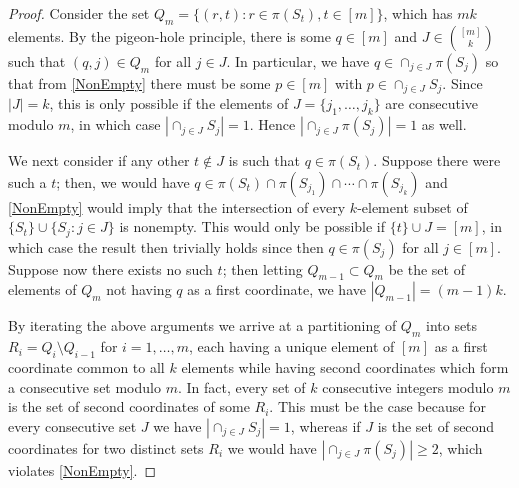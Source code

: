 \documentclass[journal, onecolumn]{IEEEtran}
\begin{document}
\begin{proof} Consider the set $Q_m = \{ (r,t) : r \in \pi(S_t), t \in [m] \}$, which has $mk$ elements. By the pigeon-hole principle, there is some $q \in [m]$ and $J \in {[m] \choose k}$ such that $(q, j) \in Q_m$ for all $j \in J$. In particular, we have $q \in \cap_{j \in J} \pi(S_j)$ so that from \eqref{NonEmpty} there must be some $p \in [m]$ with $p \in \cap_{j \in J} S_j$. Since $|J| = k$, this is only possible if the elements of $J = \{j_1, \ldots, j_k\}$ are consecutive modulo $m$, in which case $|\cap_{j \in J} S_j| = 1$. Hence $|\cap_{j \in J} \pi(S_j)| = 1$ as well.

We next consider if any other $t \notin J$ is such that $q \in \pi(S_t)$. Suppose there were such a $t$; then, we would have $q \in \pi(S_t) \cap \pi(S_{j_1}) \cap \cdots \cap \pi(S_{j_k})$ and \eqref{NonEmpty} would imply that the intersection of every $k$-element subset of $\{S_t\} \cup \{S_j: j \in J\}$ is nonempty. This would only be possible if $\{t\} \cup J = [m]$, in which case the result then trivially holds since then $q \in \pi(S_j)$ for all $j \in [m]$.  Suppose now there exists no such $t$; then letting $Q_{m-1} \subset Q_m$ be the set of elements of $Q_m$ not having $q$ as a first coordinate, we have $|Q_{m-1}| = (m-1)k$. 

By iterating the above arguments we arrive at a partitioning of $Q_m$ into sets $R_i = Q_i \setminus Q_{i-1}$ for $i = 1, \ldots, m$, each having a unique element of $[m]$ as a first coordinate common to all $k$ elements while having second coordinates which form a consecutive set modulo $m$. In fact, every set of $k$ consecutive integers modulo $m$ is the set of second coordinates of some $R_i$. This must be the case because for every consecutive set $J$ we have $|\cap_{j \in J} S_j| = 1$, whereas if $J$ is the set of second coordinates for two distinct sets $R_i$ we would have $|\cap_{j \in J} \pi(S_j)| \geq 2$, which violates \eqref{NonEmpty}. 
\end{proof}
\end{document}
